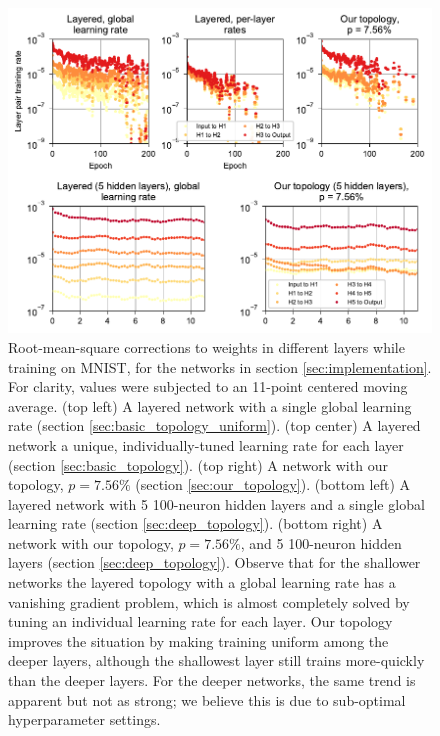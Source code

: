 \documentclass[utf8]{frontiersSCNS}
\begin{document}
\begin{figure}
  \centering
  \includegraphics[width=\columnwidth]{figures/MNIST_individual_layers.pdf}
  \caption{Root-mean-square corrections to weights in different layers while training on MNIST, for the networks in section \ref{sec:implementation}. For clarity, values were subjected to an 11-point centered moving average. (top left) A layered network with a single global learning rate (section \ref{sec:basic_topology_uniform}). (top center) A layered network a unique, individually-tuned learning rate for each layer (section \ref{sec:basic_topology}).  (top right) A network with our topology, $p = 7.56\%$ (section \ref{sec:our_topology}). (bottom left) A layered network with 5 100-neuron hidden layers and a single global learning rate (section \ref{sec:deep_topology}). (bottom right) A network with our topology, $p=7.56\%$, and 5 100-neuron hidden layers (section \ref{sec:deep_topology}). Observe that for the shallower networks the layered topology with a global learning rate has a vanishing gradient problem, which is almost completely solved by tuning an individual learning rate for each layer. Our topology improves the situation by making training uniform among the deeper layers, although the shallowest layer still trains more-quickly than the deeper layers. For the deeper networks, the same trend is apparent but not as strong; we believe this is due to sub-optimal hyperparameter settings.}  
  \label{fig:mnist_layers}
\end{figure}
\end{document}

